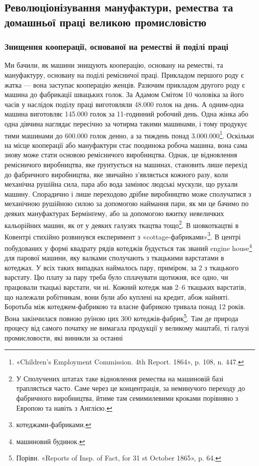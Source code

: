 
\subsection{Революціонізування мануфактури, ремества та домашньої
праці великою промисловістю}

\subsubsection{Знищення кооперації, основаної
на реместві й поділі праці}

Ми бачили, як машини знищують кооперацію, основану на
реместві, та мануфактуру, основану на поділі ремісничої
праці. Прикладом першого роду є жатка — вона заступає кооперацію
женців. Разючим прикладом другого роду є машина до
фабрикації швацьких голок. За Адамом Смітом 10 чоловіка за
його часів у наслідок поділу праці виготовляли \num{48.000} голок на
день. А одним-одна машина виготовляє \num{145.000} голок за 11-годинний
робочий день. Одна жінка або одна дівчина наглядає
пересічно за чотирма такими машинами, і тому продукує тими
машинами до \num{600.000} голок денно, а за тиждень понад \num{3.000.000}\footnote{
«Children’s Employment Commission. 4th Report. 1864», p. 108,
n. 447.
}.
Оскільки на місце кооперації або мануфактури стає поодинока
робоча машина, вона сама знову може стати основою ремісничого
виробництва. Однак, це відновлення ремісничого виробництва,
яке ґрунтується на машинах, становить лише перехід до фабричного
виробництва, яке звичайно з’являється кожного разу, коли
механічна рушійна сила, пара або вода замінює людські мускули,
що рухали машину. Спорадично і лише переходово дрібне виробництво
може сполучатися з механічною рушійною силою за
допомогою наймання пари, як ми це бачимо по деяких мануфактурах
Бермінґему, або за допомогою вжитку невеличких кальорійних
машин, як от у деяких галузях ткацтва тощо\footnote{
У Сполучених штатах таке відновлення ремества на машиновій
базі трапляється часто. Саме через це концентрація, за неминучого переходу
до фабричного виробництва, йтиме там семимилевими кроками порівняно
з Европою та навіть з Англією.
}. В шовкоткацтві в Ковентрі стихійно розвинувся експеримент з
«cottage-фабриками»\footnote*{
котеджами-фабриками. 
}.
В центрі побудованих у формі квадрату рядів котеджів
будується так званий engine house\footnote*{
машиновий будинок. 
} для парової машини, яку валками сполучають з ткацькими варстатами в котеджах.
У всіх таких випадках наймалось пару, приміром, за 2
з ткацького варстату. Цю плату за пару треба було сплачувати
щотижня, все одно, чи працювали ткацькі варстати, чи ні. Кожний
котедж мав 2--6 ткацьких варстатів, що належали робітникам,
вони були або куплені на кредит, абож найняті. Боротьба між
котеджем-фабрикою та власне фабрикою тривала понад 12 років.
Вона закінчилася повною руїною цих 300 котеджів-фабрик\footnote{
Порівн. «Reports of Insp. of Fact, for 31 st October 1865», p. 64.
}. Там де природа процесу від самого початку не вимагала продукції у великому
маштабі, ті галузі промисловости, які виникли за останні
\parbreak{}  %

